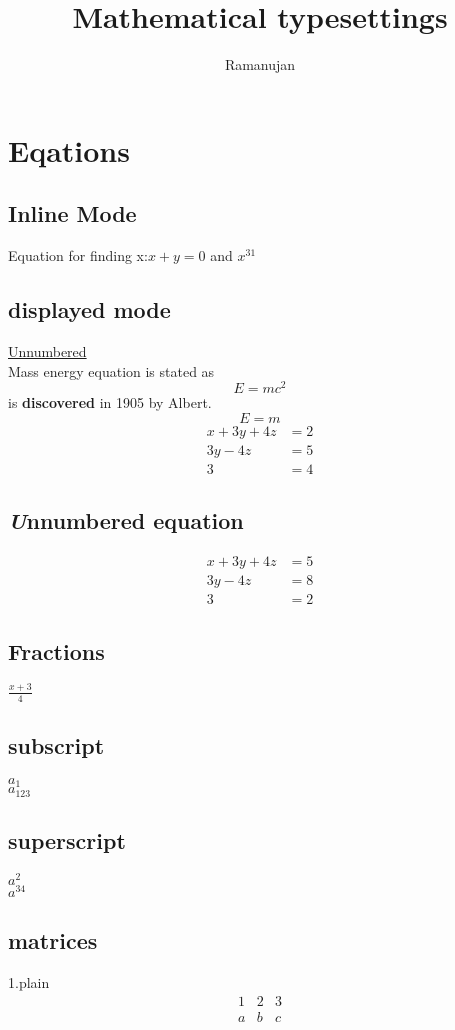 \documentclass[12pt,openany]{book}
\begin{document}
\title{Mathematical typesettings}
\author{Ramanujan}
\maketitle
\chapter{Eqations}
\section{Inline Mode}
Equation for finding x:$ x+y=0 $ and $ x^{31} $ 

\section{displayed mode}
\underline{Unnumbered}\\
Mass energy equation is stated as $$E=mc^2$$ is \textbf{discovered} in 1905 by Albert.
\begin{equation}
E=m
\end{equation}
\begin{align}
x+3y+4z&=2\\
3y-4z&=5\\
3&=4
\end{align}
\section{\textbf{\textit Unnumbered equation}}
\begin{align*}
x+3y+4z&=5\\
3y-4z&=8\\
3&=2
\end{align*}
\section{Fractions}
$ \frac{x+3}{4} $
\section{subscript} 
$ a_1 $ \\
$ a_{123} $ 
\section{superscript}
$ a^2 $ \\
$ a^{34} $

\section{matrices}
1.plain
$$
\begin{matrix}
1 & 2 & 3 \\
a & b & c
\end{matrix}
$$
\end{document}
